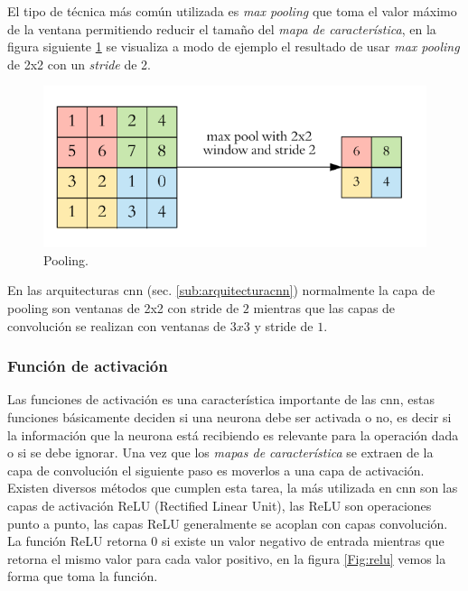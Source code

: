 El tipo de técnica más común utilizada es \textit{max pooling} que toma el valor máximo de la ventana permitiendo reducir el tamaño del \textit{mapa de característica}, en la figura siguiente \ref{Fig:Pooling} se visualiza a modo de ejemplo el resultado de usar \textit{max pooling} de 2x2 con un \textit{stride} de 2.

\begin{figure}[H]
 \centering
  \includegraphics[scale=0.4,keepaspectratio=true,clip=true]{imagenes/MarcoTeorico/pooling_1.png}
  \caption{Pooling.} \label{Fig:Pooling}%
\end{figure}

En las arquitecturas \ac{cnn} (sec. \ref{sub:arquitecturacnn}) normalmente la capa de pooling son ventanas de 2x2 con stride de $2$ mientras que las capas de  convolución se realizan con ventanas de $3x3$ y stride de $1$. 

\subsubsection{Función de activación}\label{sub:relu}
Las funciones de activación es una característica  importante de las \ac{cnn}, estas funciones básicamente deciden si una neurona debe ser activada o no, es decir si la información que la neurona está recibiendo es relevante para la operación dada o si se debe ignorar. Una vez que los \textit{mapas de característica} se extraen de la capa de convolución el siguiente paso es moverlos a una capa de activación. Existen diversos métodos que cumplen esta tarea, la más utilizada en  \ac{cnn} son las capas de activación ReLU (Rectified Linear Unit), las  ReLU son operaciones punto a punto, las capas ReLU generalmente se acoplan con capas convolución. La función ReLU retorna 0 si existe un valor negativo de entrada mientras que retorna el mismo valor para cada valor positivo, en la figura  \ref{Fig:relu} vemos la forma que toma la función.

